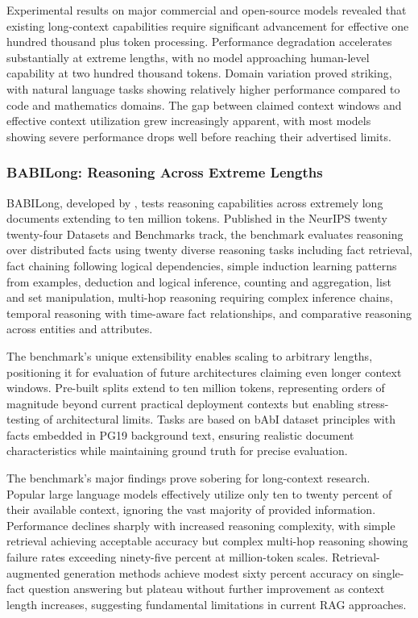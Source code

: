 Experimental results on major commercial and open-source models revealed that existing long-context capabilities require significant advancement for effective one hundred thousand plus token processing. Performance degradation accelerates substantially at extreme lengths, with no model approaching human-level capability at two hundred thousand tokens. Domain variation proved striking, with natural language tasks showing relatively higher performance compared to code and mathematics domains. The gap between claimed context windows and effective context utilization grew increasingly apparent, with most models showing severe performance drops well before reaching their advertised limits.

\subsubsection{BABILong: Reasoning Across Extreme Lengths}

BABILong, developed by \citet{kuratov2024babilong}, tests reasoning capabilities across extremely long documents extending to ten million tokens. Published in the NeurIPS twenty twenty-four Datasets and Benchmarks track, the benchmark evaluates reasoning over distributed facts using twenty diverse reasoning tasks including fact retrieval, fact chaining following logical dependencies, simple induction learning patterns from examples, deduction and logical inference, counting and aggregation, list and set manipulation, multi-hop reasoning requiring complex inference chains, temporal reasoning with time-aware fact relationships, and comparative reasoning across entities and attributes.

The benchmark's unique extensibility enables scaling to arbitrary lengths, positioning it for evaluation of future architectures claiming even longer context windows. Pre-built splits extend to ten million tokens, representing orders of magnitude beyond current practical deployment contexts but enabling stress-testing of architectural limits. Tasks are based on bAbI dataset principles with facts embedded in PG19 background text, ensuring realistic document characteristics while maintaining ground truth for precise evaluation.

The benchmark's major findings prove sobering for long-context research. Popular large language models effectively utilize only ten to twenty percent of their available context, ignoring the vast majority of provided information. Performance declines sharply with increased reasoning complexity, with simple retrieval achieving acceptable accuracy but complex multi-hop reasoning showing failure rates exceeding ninety-five percent at million-token scales. Retrieval-augmented generation methods achieve modest sixty percent accuracy on single-fact question answering but plateau without further improvement as context length increases, suggesting fundamental limitations in current RAG approaches.

